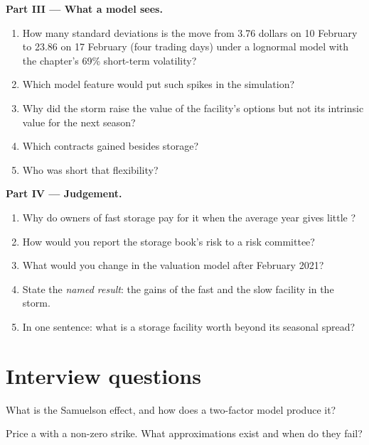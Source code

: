 \begin{problem}
\medskip\noindent\textbf{Part III --- What a model sees.}
\begin{enumerate}[resume]
\item How many standard deviations is the move from 3.76 dollars on 10 February to 23.86
on 17 February (four trading days) under a lognormal model with the chapter's 69\%
short-term volatility?
\item Which model feature would put such spikes in the simulation?
\item Why did the storm raise the value of the facility's options but not its intrinsic
value for the next season?
\item Which contracts gained besides storage?
\item Who was short that flexibility?
\end{enumerate}

\medskip\noindent\textbf{Part IV --- Judgement.}
\begin{enumerate}[resume]
\item Why do owners of fast storage pay for it when the average year gives little
?
\item How would you report the storage book's risk to a risk committee?
\item What would you change in the valuation model after February 2021?
\item State the \emph{named result}: the gains of the fast and the slow facility in the
storm.
\item In one sentence: what is a storage facility worth beyond its seasonal spread?
\end{enumerate}
\end{problem}

\section{Interview questions}

\begin{interviewq}\label{iq:rc:commodity-and-energy-derivatives:1}
What is the Samuelson effect, and how does a two-factor model produce it?
\end{interviewq}

\begin{interviewq}\label{iq:rc:commodity-and-energy-derivatives:2}
Price a  with a non-zero strike. What approximations exist and when do they
fail?
\end{interviewq}

